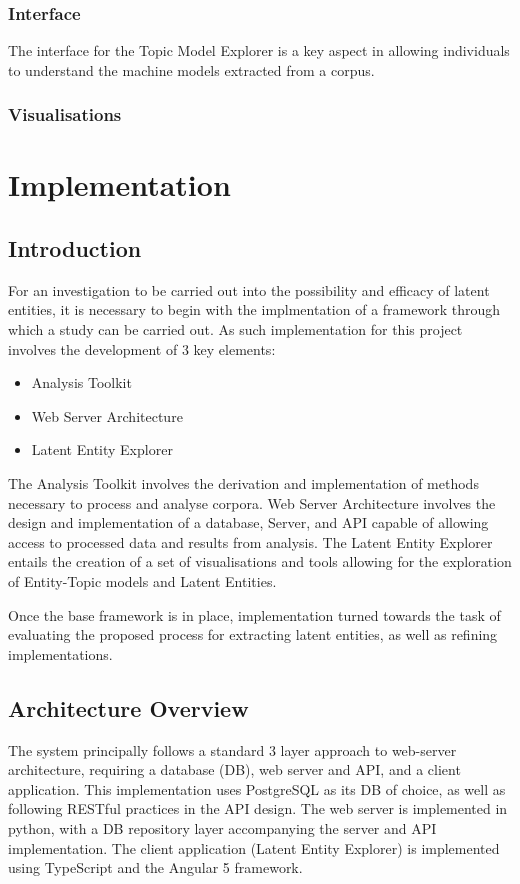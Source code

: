\documentclass[10pt]{report}
\begin{document}
\subsection{Interface}
The interface for the Topic Model Explorer is a key aspect in allowing individuals to understand the machine models extracted from a corpus.

\subsection{Visualisations}

%
%
%
%
%
\chapter{Implementation}
\section{Introduction}
For an investigation to be carried out into the possibility and efficacy of latent entities, it is necessary to begin with the implmentation of a framework through which a study can be carried out. As such implementation for this project involves the development of 3 key elements:

\renewcommand{\baselinestretch}{0.5}\normalsize
\begin{itemize}
\item Analysis Toolkit
\item Web Server Architecture
\item Latent Entity Explorer
\end{itemize}
\renewcommand{\baselinestretch}{2.0}\normalsize
The Analysis Toolkit involves the derivation and implementation of methods necessary to process and analyse corpora. Web Server Architecture involves the design and implementation of a database, Server, and API capable of allowing access to processed data and results from analysis. The Latent Entity Explorer entails the creation of a set of visualisations and tools allowing for the exploration of Entity-Topic models and Latent Entities.

Once the base framework is in place, implementation turned towards the task of evaluating the proposed process for extracting latent entities, as well as refining implementations.

\section{Architecture Overview}
The system principally follows a standard 3 layer approach to web-server architecture, requiring a database (DB), web server and API, and a client application. This implementation uses PostgreSQL as its DB of choice, as well as following RESTful practices in the API design. The web server is implemented in python, with a DB repository layer accompanying the server and API implementation. The client application (Latent Entity Explorer) is implemented using TypeScript and the Angular 5 framework.
\end{document}
